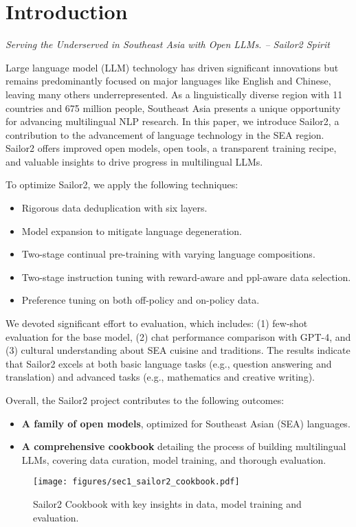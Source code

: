 \section{Introduction}

{\centering \textit{Serving the Underserved in Southeast Asia with Open LLMs. -- Sailor2 Spirit} \par}


Large language model (LLM) technology has driven significant innovations but remains predominantly focused on major languages like English and Chinese, leaving many others underrepresented. 
As a linguistically diverse region with 11 countries and 675 million people, Southeast Asia presents a unique opportunity for advancing multilingual NLP research. 
In this paper, we introduce Sailor2, a contribution to the advancement of language technology in the SEA region. Sailor2 offers improved open models, open tools, a transparent training recipe, and valuable insights to drive progress in multilingual LLMs.

To optimize Sailor2, we apply the following techniques:
\begin{itemize}
    \item Rigorous data deduplication with six layers.
    \item Model expansion to mitigate language degeneration.
    \item Two-stage continual pre-training with varying language compositions.
    \item Two-stage instruction tuning with reward-aware and ppl-aware data selection.
    \item Preference tuning on both off-policy and on-policy data.
\end{itemize}


We devoted significant effort to evaluation, which includes: (1) few-shot evaluation for the base model, (2) chat performance comparison with GPT-4, and (3) cultural understanding about SEA cuisine and traditions.
The results indicate that Sailor2 excels at both basic language tasks (e.g., question answering and translation) and advanced tasks (e.g., mathematics and creative writing).


Overall, the Sailor2 project contributes to the following outcomes:
\begin{itemize} 
    \item \textbf{A family of open models},  optimized for Southeast Asian (SEA) languages.
    \item \textbf{A comprehensive cookbook} detailing the process of building multilingual LLMs, covering data curation, model training, and thorough evaluation. 
\end{itemize}


\begin{figure}[htbp]
    \centering
    \texttt{[image: figures/sec1\_sailor2\_cookbook.pdf]}
    \caption{
    Sailor2 Cookbook with key insights in data, model training and evaluation.
    }
    \label{fig:sailor_cookbook}
\end{figure}